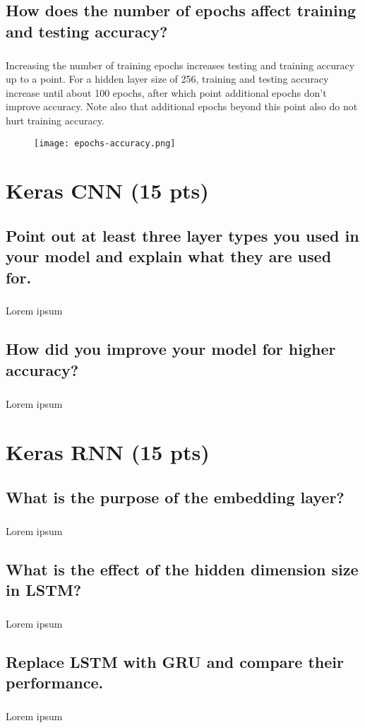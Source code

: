 \documentclass[11pt]{article}
\begin{document}
\subsection{How does the number of epochs affect training and testing accuracy?}

\subparagraph{}

Increasing the number of training epochs increases testing and training accuracy up to a point. For a hidden layer size of 256, training and testing accuracy increase until about 100 epochs, after which point additional epochs don't improve accuracy. Note also that additional epochs beyond this point also do not hurt training accuracy.

\begin{figure}[h]
	\texttt{[image: epochs-accuracy.png]}
	\label{fig:graph}
\end{figure}

\section{Keras CNN (15 pts)}

\subsection{Point out at least three layer types you used in your model and explain what they are used for.}

\subparagraph{}

Lorem ipsum

\subsection{How did you improve your model for higher accuracy?}

\subparagraph{}

Lorem ipsum

\section{Keras RNN (15 pts)}

\subsection{What is the purpose of the embedding layer?}

\subparagraph{}

Lorem ipsum

\subsection{What is the effect of the hidden dimension size in LSTM?}

\subparagraph{}

Lorem ipsum

\subsection{Replace LSTM with GRU and compare their performance.}

\subparagraph{}

Lorem ipsum
\end{document}
